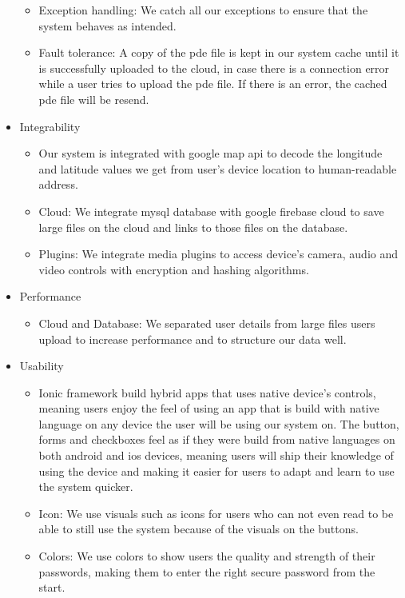 \documentclass[a4paper,12pt]{article}
\begin{document}
\begin{itemize}
\begin{itemize}
		\item Exception handling: We catch all our exceptions to ensure that the system behaves as intended.
		\item Fault tolerance: A copy of the pde file is kept in our system cache until it is successfully uploaded to the cloud, in case there is a connection error while a user tries to upload the pde file. If there is an error, the cached pde file will be resend.  
	\end{itemize}
\item Integrability
	\begin{itemize}
		\item Our system is integrated with google map api to decode the longitude and latitude values we get from user's device location to human-readable address.
		\item Cloud: We integrate mysql database with google firebase cloud to save large files on the cloud and links to those files on the database.
		\item Plugins: We integrate media plugins to access device's camera, audio and video controls with encryption and hashing algorithms. 
	\end{itemize}
\item Performance
	\begin{itemize}
		\item Cloud and Database: We separated user details from large files users upload to increase performance and to structure our data well.
	\end{itemize}
\item Usability
	\begin{itemize}
		\item Ionic framework build hybrid apps that uses native device's controls, meaning users enjoy the feel of using an app that is build with native language on any device the user will be using our system on. The button, forms and checkboxes feel as if they were build from native languages on both android and ios devices, meaning users will ship their knowledge of using the device and making it easier for users to adapt and learn to use the system quicker.
		\item Icon: We use visuals such as icons for users who can not even read to be able to still use the system because of the visuals on the buttons.
		\item Colors: We use colors to show users the quality and strength of their passwords, making them to enter the right secure password from the start.
	\end{itemize}

\end{itemize}
\end{document}
